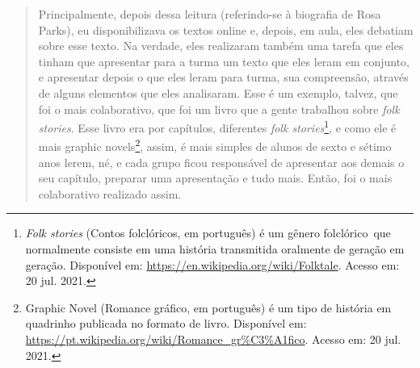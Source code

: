 \documentclass{textolivre}
\begin{document}
\begin{quote}
Principalmente, depois dessa leitura (referindo-se à biografia de Rosa Parks), eu disponibilizava os textos online e, depois, em aula, eles debatiam sobre esse texto. Na verdade, eles realizaram também uma tarefa que eles tinham que apresentar para a turma um texto que eles leram em conjunto, e apresentar depois o que eles leram para turma, sua compreensão, através de alguns elementos que eles analisaram. Esse é um exemplo, talvez, que foi o mais colaborativo, que foi um livro que a gente trabalhou sobre \emph{folk stories}. Esse livro era por capítulos, diferentes \emph{folk stories}\footnote{\emph{Folk stories} (Contos folclóricos, em português) é um gênero folclórico que normalmente consiste em uma história transmitida oralmente de geração em geração. Disponível em: \url{https://en.wikipedia.org/wiki/Folktale}. Acesso em: 20 jul. 2021.}, e como ele é mais graphic novels\footnote{Graphic Novel (Romance gráfico, em português) é um tipo de história em quadrinho publicada no formato de livro. Disponível em: \url{https://pt.wikipedia.org/wiki/Romance_gr\%C3\%A1fico}. Acesso em: 20 jul. 2021.}, assim, é mais simples de alunos de sexto e sétimo anos lerem, né, e cada grupo ficou responsável de apresentar aos demais o seu capítulo, preparar uma apresentação e tudo mais. Então, foi o mais colaborativo realizado assim.


\end{quote}
\end{document}

